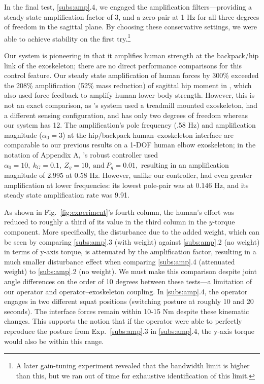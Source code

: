 \documentclass[utf8]{frontiersSCNS}
\renewcommand*{\cite}[1]{\citep{#1}}
\begin{document}
In the final test, \ref{subs:amp}.4, we engaged the amplification filters---providing a steady state amplification factor of 3, and a zero pair at 1 Hz for all three degrees of freedom in the sagittal plane.
By choosing these conservative settings, we were able to achieve stability on the first try.\footnote{A later gain-tuning experiment revealed that the bandwidth limit is higher than this, but we ran out of time for exhaustive identification of this limit.}

Our system is pioneering in that it amplifies human strength at the backpack/hip link of the exoskeleton; there are no direct performance comparisons for this control feature.
Our steady state amplification of human forces by 300\% exceeded the 208\% amplification (52\% mass reduction) of sagittal hip moment in \cite{ZanottoAkiyamaStegallAgrawal2015TRO}, which also used force feedback to amplify human lower-body strength.
However, this is not an exact comparison, as \cite{ZanottoAkiyamaStegallAgrawal2015TRO}'s system used a treadmill mounted exoskeleton, had a different sensing configuration, and has only two degrees of freedom whereas our system has 12.
The amplification's pole frequency (.58 Hz) and amplification magnitude ($\alpha_0=3$) at the hip/backpack human--exoskeleton interface are comparable to our previous results on a 1-DOF human elbow exoskeleton; in the notation of Appendix A, \cite{HeThomasPaineSentis2019ACC}'s robust controller used $\alpha_0=10,\ k_G=0.1,\ Z_g=10,\ \text{and}\ P_g=0.01,$ resulting in an amplification magnitude of 2.995 at 0.58 Hz.
However, unlike our controller, \cite{HeThomasPaineSentis2019ACC} had even greater amplification at lower frequencies: its lowest pole-pair was at $0.146$ Hz, and its steady state amplification rate was 9.91.


As shown in Fig.~\ref{fig:experiment}'s fourth column, the human's effort was reduced to roughly a third of its value in the third column in the $y$-torque component.
More specifically, the disturbance due to the added weight, which can be seen by comparing \ref{subs:amp}.3 (with weight) against \ref{subs:amp}.2 (no weight) in terms of y-axis torque, is attenuated by the amplification factor, resulting in a much smaller disturbance effect when comparing \ref{subs:amp}.4 (attenuated weight) to \ref{subs:amp}.2 (no weight). We must make this comparison despite joint angle differences on the order of 10 degrees between these tests---a limitation of our operator and operator--exoskeleton coupling. In \ref{subs:amp}.4, the operator engages in two different squat positions (switching posture at roughly 10 and 20 seconds). The interface forces remain within 10-15 Nm despite these kinematic changes. This supports the notion that if the operator were able to perfectly reproduce the posture from Exp.~\ref{subs:amp}.3 in \ref{subs:amp}.4, the y-axis torque would also be within this range.
\end{document}
